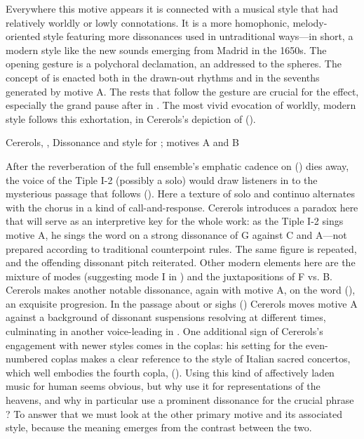 Everywhere this motive appears it is connected with a musical style that had
relatively worldly or lowly connotations.
It is a more homophonic, melody-oriented style featuring more dissonances used
in untraditional ways---in short, a modern style like the new sounds
emerging from Madrid in the 1650s.
The opening gesture is a polychoral declamation, an  addressed to
the spheres.
The concept of  is enacted both in the drawn-out rhythms and
in the sevenths generated by motive A.
The rests that follow the gesture are crucial for the effect, especially the
grand pause after  in .
The most vivid evocation of worldly, modern style follows this exhortation, in
Cererols's depiction of  ().


\begin{musicexample}
    \caption{Cererols, , Dissonance and
     style for ; motives A and
    B} 
    \label{mus:Cererols-Suspended-consonancia}
\end{musicexample}

After the reverberation of the full ensemble's emphatic cadence on
 () dies away, the voice of the Tiple I-2
(possibly a solo) would draw listeners in to the mysterious passage that
follows ().
Here a texture of solo and continuo alternates with the chorus in a kind of
call-and-response.
Cererols introduces a paradox here that will serve as an interpretive key for
the whole work: as the Tiple I-2 sings motive A, he sings the word
 on a strong dissonance of G against C\sh{} and A---not
prepared according to traditional counterpoint rules.
The same figure is repeated, and the offending dissonant pitch reiterated.
Other modern elements here are the mixture of modes (suggesting mode I in
) and the juxtapositions of F\sh{} vs. B\fl{}.
Cererols makes another notable dissonance, again with motive A, on the word
 (), an exquisite
 progresion.
In the passage about  or sighs () Cererols
moves motive A against a background of dissonant suspensions resolving at
different times, culminating in another voice-leading  in
.
One additional sign of Cererols's engagement with newer styles comes in the
coplas: his setting for the even-numbered coplas makes a clear reference to the
style of Italian sacred concertos, which well embodies the fourth copla,
 ().
Using this kind of affectively laden music for human  seems
obvious, but why use it for representations of the heavens, and why in
particular use a prominent dissonance for the crucial phrase ?
To answer that we must look at the other primary motive and its associated
style, because the meaning emerges from the contrast between the two.

